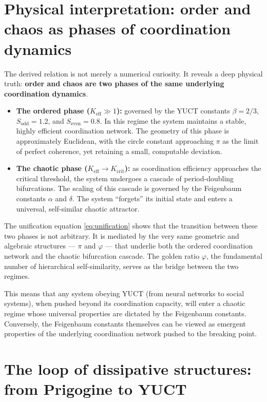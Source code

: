 \documentclass[11pt,a4paper]{article}
\begin{document}
	\section{Physical interpretation: order and chaos as phases of coordination dynamics}
	
	The derived relation is not merely a numerical curiosity. It reveals a deep physical truth: \textbf{order and chaos are two phases of the same underlying coordination dynamics}.
	
	\begin{itemize}
		\item \textbf{The ordered phase (\(K_{\mathrm{eff}} \gg 1\)):} governed by the YUCT constants \(\beta = 2/3\), \(S_{\mathrm{odd}} = 1.2\), and \(S_{\mathrm{even}} = 0.8\). In this regime the system maintains a stable, highly efficient coordination network. The geometry of this phase is approximately Euclidean, with the circle constant approaching \(\pi\) as the limit of perfect coherence, yet retaining a small, computable deviation.
		
		\item \textbf{The chaotic phase (\(K_{\mathrm{eff}} \to K_{\mathrm{crit}}\)):} as coordination efficiency approaches the critical threshold, the system undergoes a cascade of period-doubling bifurcations. The scaling of this cascade is governed by the Feigenbaum constants \(\alpha\) and \(\delta\). The system “forgets” its initial state and enters a universal, self-similar chaotic attractor.
	\end{itemize}
	
	The unification equation \eqref{eq:unification} shows that the transition between these two phases is not arbitrary. It is mediated by the very same geometric and algebraic structures — \(\pi\) and \(\varphi\) — that underlie both the ordered coordination network and the chaotic bifurcation cascade. The golden ratio \(\varphi\), the fundamental number of hierarchical self-similarity, serves as the bridge between the two regimes.
	
	This means that any system obeying YUCT (from neural networks to social systems), when pushed beyond its coordination capacity, will enter a chaotic regime whose universal properties are dictated by the Feigenbaum constants. Conversely, the Feigenbaum constants themselves can be viewed as emergent properties of the underlying coordination network pushed to the breaking point.
	
	\section{The loop of dissipative structures: from Prigogine to YUCT}
	\label{sec:prigogine}
	
\end{document}
